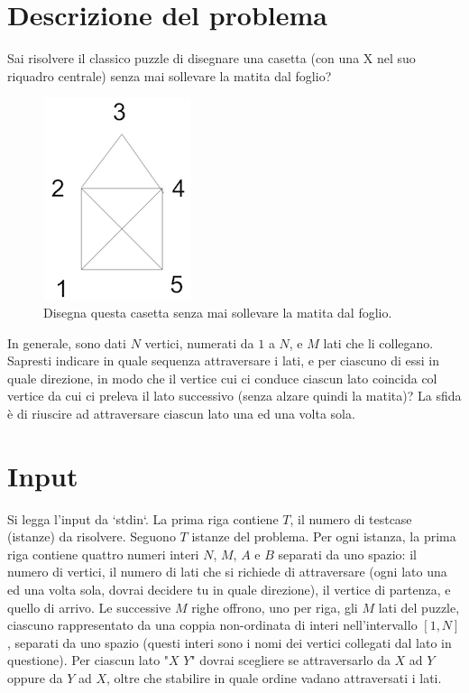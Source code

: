 \documentclass[a4paper,11pt]{article}
\begin{document}
\vspace{0.5cm}



\section*{Descrizione del problema}
   
Sai risolvere il classico puzzle di disegnare una casetta (con una X
nel suo riquadro centrale) senza mai sollevare la
matita dal foglio? 

\begin{figure}[h!]
  \centering
  \includegraphics{casetta.png}
  \caption{Disegna questa casetta senza mai sollevare la
matita dal foglio.}
\end{figure}

In generale, sono dati $N$ vertici, numerati da $1$ a
$N$, e $M$ lati che li collegano. Sapresti indicare in quale sequenza attraversare i lati, e per ciascuno di essi in quale direzione, in modo che il vertice cui ci conduce ciascun lato coincida col vertice da cui ci preleva il lato successivo (senza alzare quindi la matita)? La sfida è di riuscire ad attraversare ciascun lato una ed una volta sola.

\section*{Input}
Si legga l'input da `stdin`.
La prima riga contiene $T$, il numero di testcase (istanze) da risolvere. Seguono $T$
istanze del problema. Per ogni istanza, la prima riga contiene quattro numeri interi $N$,
$M$, $A$ e $B$ separati da uno spazio:
il numero di vertici, il numero di lati che si richiede di attraversare (ogni lato una ed una volta sola, dovrai decidere tu in quale direzione), il vertice di
partenza, e quello di arrivo.
Le successive $M$ righe offrono, uno per riga, gli $M$ lati del puzzle, ciascuno rappresentato da una
coppia non-ordinata di interi nell'intervallo $[1,N]$, separati da uno spazio (questi interi sono i nomi dei vertici collegati dal lato in questione). Per ciascun lato "$X$ $Y$" dovrai scegliere se attraversarlo da $X$ ad $Y$ oppure da $Y$ ad $X$, oltre che stabilire in quale ordine vadano attraversati i lati.
\end{document}
